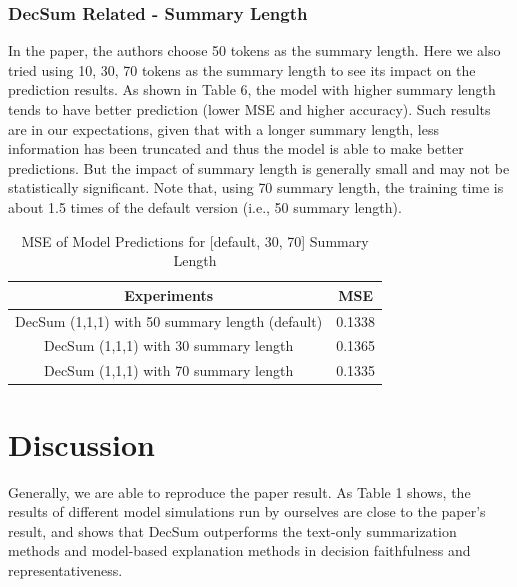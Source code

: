 \documentclass{article}
\begin{document}
\subsubsection{DecSum Related - Summary Length}

In the paper, the authors choose 50 tokens as the summary length. Here we also tried using 10, 30, 70 tokens as the summary length to see its impact on the prediction results.
As shown in Table 6, the model with higher summary length tends to have better prediction (lower MSE and higher accuracy).
Such results are in our expectations, given that with a longer summary length, less information has been truncated and thus the model is able to make better predictions.
But the impact of summary length is generally small and may not be statistically significant.
Note that, using 70 summary length, the training time is about 1.5 times of the default version (i.e., 50 summary length).

\begin{table}[ht]
    \centering
    \caption{MSE of Model Predictions for [default, 30, 70] Summary Length}
    \begin{tabular}{|c|c|}
        \hline \textbf{Experiments} & MSE \\
        \hline DecSum (1,1,1) with 50 summary length (default) & 0.1338 \\
        \hline DecSum (1,1,1) with 30 summary length & 0.1365 \\
        \hline DecSum (1,1,1) with 70 summary length & 0.1335 \\ \hline
    \end{tabular}
\end{table}



\section{Discussion}
Generally, we are able to reproduce the paper result. As Table 1 shows, the results of different model simulations run by ourselves are close to the paper’s result, and shows that DecSum outperforms
the text-only summarization methods and model-based explanation methods in decision faithfulness and representativeness.
\end{document}
